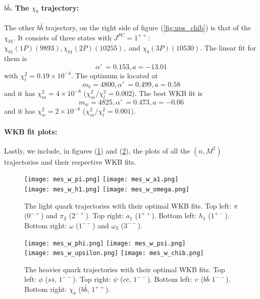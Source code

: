 \documentclass[11pt,a4]{article}
\newcommand{\alp}{\ensuremath{\alpha'\:}}
\newcommand{\ssb}{s\bar{s}}
\newcommand{\ccb}{c\bar{c}}
\newcommand{\bbb}{b\bar{b}}
\newcommand{\rchi}[1]{\ensuremath{\chi^2_m/\chi^2_l = #1}}
\newcommand{\ten}[1]{\times10^{#1}}
\begin{document}
				\paragraph{\(\bbb\). The \(\chi_b\) trajectory:} The other \(\bbb\) trajectory, on the right side of figure (\ref{fig:ups_chib}) is that of the \(\chi_{b1}\). It consists of three states with \(J^{PC} = 1^{++}\): \(\chi_{b1}(1P)(9893), \chi_{b1}(2P)(10255),\) and \(\chi_b(3P)(10530)\). The linear fit for them is
				\[ \alp = 0.153, a = -13.01 \]
				with \(\chi^2_l = 0.19\ten{-4}\). The optimum is located at
				\[ m_b = 4800, \alp = 0.499, a = 0.58 \]
				and it has \(\chi^2_m = 4\ten{-8}\) (\rchi{0.002}). The best WKB fit is
				\[ m_w = 4825, \alp = 0.473, a = -0.06 \]
				and it has \(\chi^2_w = 2\ten{-8}\) (\rchi{0.001}).
				
				\paragraph{WKB fit plots:} Lastly, we include, in figures (\ref{fig:wkb_light}) and (\ref{fig:wkb_heavy}), the plots of all the \((n,M^2)\) trajectories and their respective WKB fits.
				
				\begin{figure}[tbp] \centering
						\texttt{[image: mes\_w\_pi.png]}	 \hfill
						\texttt{[image: mes\_w\_a1.png]} \\
						\texttt{[image: mes\_w\_h1.png]}	 \hfill
						\texttt{[image: mes\_w\_omega.png]} \\
						\caption{\label{fig:wkb_light} The light quark trajectories with their optimal WKB fits. Top left: \(\pi\) (\(0^{-+}\)) and \(\pi_2\) (\(2^{-+}\)). Top right: \(a_1\) (\(1^{++}\)). Bottom left: \(h_1\) (\(1^{+-}\)). Bottom right: \(\omega\) (\(1^{--}\)) and \(\omega_3\) (\(3^{--}\)).}
				\end{figure}
				
				\begin{figure}[tbp] \centering
						\texttt{[image: mes\_w\_phi.png]}	 \hfill
						\texttt{[image: mes\_w\_psi.png]} \\
						\texttt{[image: mes\_w\_upsilon.png]}	 \hfill
						\texttt{[image: mes\_w\_chib.png]} \\
						\caption{\label{fig:wkb_heavy} The heavier quark trajectories with their optimal WKB fits. Top left: \(\phi\) (\(\ssb\), \(1^{--}\)). Top right: \(\psi\) (\(\ccb\), \(1^{--}\)). Bottom left: \(\upsilon\) (\(\bbb\) \(1^{--}\)). Bottom right: \(\chi_b\) (\(\bbb\), \(1^{++}\)).}
				\end{figure}
\end{document}

